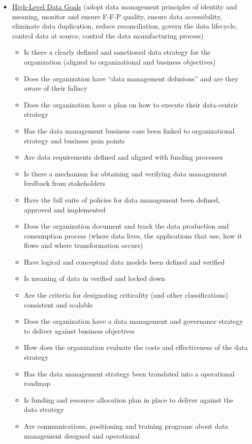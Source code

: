 \begin{itemize}
  \item \ul{High-Level Data Goals} (adopt data management principles of identity and meaning, monitor and ensure F-F-P quality, ensure data accessibility, eliminate data duplication, reduce reconciliation, govern the data lifecycle, control data at source, control the data manufacturing process)

    \begin{itemize}
      \item Is there a clearly defined and sanctioned data strategy for the organization (aligned to organizational and business objectives)
      \item Does the organization have “data management delusions” and are they aware of their fallacy
      \item Does the organization have a plan on how to execute their data-centric strategy
      \item Has the data management business case been linked to organizational strategy and business pain points
      \item Are data requirements defined and aligned with funding processes
      \item Is there a mechanism for obtaining and verifying data management feedback from stakeholders
      \item Have the full suite of policies for data management been defined, approved and implemented
      \item Does the organization document and track the data production and consumption process (where data lives, the applications that use, how it flows and where transformation occurs)
      \item Have logical and conceptual data models been defined and verified
      \item Is meaning of data in  verified and locked down
      \item Are the criteria for designating criticality (and other classifications) consistent and scalable
      \item Does the organization have a data management and governance strategy to deliver against business objectives
      \item How does the organization evaluate the costs and effectiveness of the data strategy
      \item Has the data management strategy been translated into a operational roadmap
      \item Is funding and resource allocation plan in place to deliver against the data strategy
      \item Are communications, positioning and training programs about data management designed and operational
    \end{itemize}
\end{itemize}










